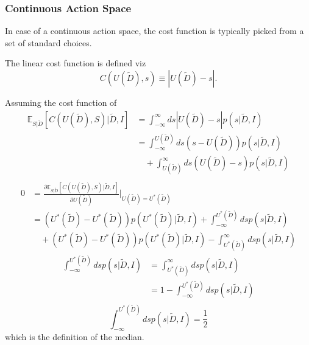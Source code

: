 \subsubsection{Continuous Action Space}
In case of a continuous action space, the cost function is typically picked from a set of standard choices.	
\begin{definition}
	\label{def:linear_cost_function}
	The linear cost function is defined viz
	\begin{equation}
		C(U(\tilde{D}),s) \equiv |U(\tilde{D})-s|.
	\end{equation}
	
\end{definition}
\begin{theorem}
	\label{def:median_decision_rule}
	Assuming the cost function of 
	\begin{equation}
		\begin{split}
			\mathbb{E}_{S|\tilde{D}}[C(U(\tilde{D}), S)|\tilde{D},I] &= \int_{-\infty}^{\infty} ds |U(\tilde{D})-s| p(s|\tilde{D},I)\\
			&= \int_{-\infty}^{U(\tilde{D})}ds (s-U(\tilde{D}))p(s|\tilde{D},I)\\
			&\quad+\int_{U(\tilde{D})}^\infty ds (U(\tilde{D})-s)p(s|\tilde{D},I)\\
		\end{split}
	\end{equation}
	\begin{equation}
		\begin{split}
			0 &=\frac{\partial \mathbb{E}_{S|\tilde{D}}[C(U(\tilde{D}), S)|\tilde{D},I]}{\partial U(\tilde{D})}\bigg|_{U(\tilde{D})=U^*(\tilde{D})}\\
			&= (U^*(\tilde{D})-U^*(\tilde{D}))p(U^*(\tilde{D})|\tilde{D},I)+\int_{-\infty}^{U^*(\tilde{D})}ds p(s|\tilde{D},I)\\
			&\quad+(U^*(\tilde{D})-U^*(\tilde{D}))p(U^*(\tilde{D})|\tilde{D},I)-\int_{U^*(\tilde{D})}^\infty ds p(s|\tilde{D},I)
		\end{split}
	\end{equation}
	\begin{equation}
		\begin{split}
			\int_{-\infty}^{U^*(\tilde{D})}ds p(s|\tilde{D},I) &= \int_{U^*(\tilde{D})}^\infty ds p(s|\tilde{D},I)\\
			&= 1- \int_{-\infty}^{U^*(\tilde{D})} ds p(s|\tilde{D},I)\\
		\end{split}
	\end{equation}
	\begin{equation}
		\int_{-\infty}^{U^*(\tilde{D})} ds p(s|\tilde{D},I) = \frac{1}{2}
	\end{equation}
	which is the definition of the median.
\end{theorem}

